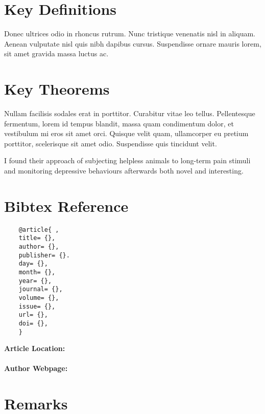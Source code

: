 \documentclass[10pt,letterpaper,twocolumn,landscape]{article}
\begin{document}
\section{Key Definitions}

\begin{defn}
Donec ultrices odio in rhoncus rutrum. Nunc tristique venenatis nisl in aliquam. Aenean vulputate nisl quis nibh dapibus cursus. Suspendisse ornare mauris lorem, sit amet gravida massa luctus ac. 
\end{defn}

\section{Key Theorems}

\begin{thm}
Nullam facilisis sodales erat in porttitor. Curabitur vitae leo tellus. Pellentesque fermentum, lorem id tempus blandit, massa quam condimentum dolor, et vestibulum mi eros sit amet orci. Quisque velit quam, ullamcorper eu pretium porttitor, scelerisque sit amet odio. Suspendisse quis tincidunt velit. 
\end{thm}

\begin{nt}
I found their approach of subjecting helpless animals to long-term pain stimuli and monitoring depressive behaviours afterwards both novel and interesting.
\end{nt}

\section*{Bibtex Reference}
\begin{verbatim}
	@article{ ,
    title= {},
    author= {},
    publisher= {}.
    day= {},
    month= {},
    year= {},
    journal= {},
    volume= {},
    issue= {},
    url= {},
    doi= {},
    }
\end{verbatim}

\textbf{Article Location:} \\
\url{} \\

\textbf{Author Webpage:} \\
\url{}

\section{Remarks}
\end{document}
